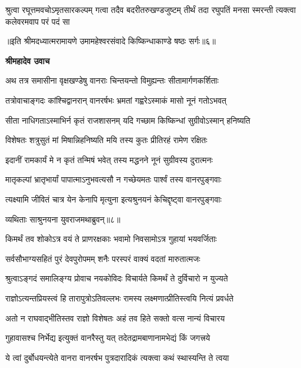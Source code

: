 \fourlineindentedshloka
{श्रुत्वा रघूत्तमवचोऽमृतसारकल्पम्}
{गत्वा तदैव बदरीतरुखण्डजुष्टम्}
{तीर्थं तदा रघुपतिं मनसा स्मरन्ती}
{त्यक्त्वा कलेवरमवाप परं पदं सा} %

{॥इति श्रीमदध्यात्मरामायणे उमामहेश्वरसंवादे किष्किन्धाकाण्डे
षष्ठः सर्गः॥६॥}




\textbf{श्रीमहादेव उवाच}

\twolineshloka
{अथ तत्र समासीना वृक्षखण्डेषु वानराः}
{चिन्तयन्तो विमुह्यन्तः सीतामार्गणकर्शिताः} %

\twolineshloka
{तत्रोवाचाङ्गदः कांश्चिद्वानरान् वानरर्षभः}
{भ्रमतां गह्वरेऽस्माकं मासो नूनं गतोऽभवत्} %

\twolineshloka
{सीता नाधिगताऽस्माभिर्न कृतं राजशासनम्}
{यदि गच्छाम किष्किन्धां सुग्रीवोऽस्मान् हनिष्यति} %

\twolineshloka
{विशेषतः शत्रुसुतं मां मिषान्निहनिष्यति}
{मयि तस्य कुतः प्रीतिरहं रामेण रक्षितः} %

\twolineshloka
{इदानीं रामकार्यं मे न कृतं तन्मिषं भवेत्}
{तस्य मद्धनने नूनं सुग्रीवस्य दुरात्मनः} %

\twolineshloka
{मातृकल्पां भ्रातृभार्यां पापात्माऽनुभवत्यसौ}
{न गच्छेयमतः पार्श्वं तस्य वानरपुङ्गवाः} %

\twolineshloka
{त्यक्ष्यामि जीवितं चात्र येन केनापि मृत्युना}
{इत्यश्रुनयनं केचिद्दृष्ट्वा वानरपुङ्गवाः} %

{व्यथिताः साश्रुनयना युवराजमथाब्रुवन्॥८॥} %


\twolineshloka
{किमर्थं तव शोकोऽत्र वयं ते प्राणरक्षकाः}
{भवामो निवसामोऽत्र गुहायां भयवर्जिताः} %

\twolineshloka
{सर्वसौभाग्यसहितं पुरं देवपुरोपमम्}
{शनैः परस्परं वाक्यं वदतां मारुतात्मजः} %

\twolineshloka
{श्रुत्वाऽङ्गदं समालिङ्ग्य प्रोवाच नयकोविदः}
{विचार्यते किमर्थं ते दुर्विचारो न युज्यते} %

\twolineshloka
{राज्ञोऽत्यन्तप्रियस्त्वं हि तारापुत्रोऽतिवल्लभः}
{रामस्य लक्ष्मणात्प्रीतिस्त्वयि नित्यं प्रवर्धते} %

\twolineshloka
{अतो न राघवाद्भीतिस्तव राज्ञो विशेषतः}
{अहं तव हिते सक्तो वत्स नान्यं विचारय} %

\twolineshloka
{गुहावासश्च निर्भेद्य इत्युक्तं वानरैस्तु यत्}
{तदेतद्रामबाणानामभेद्यं किं जगत्त्रये} %

\twolineshloka
{ये त्वां दुर्बोधयन्त्येते वानरा वानरर्षभ}
{पुत्रदारादिकं त्यक्त्वा कथं स्थास्यन्ति ते त्वया} %


